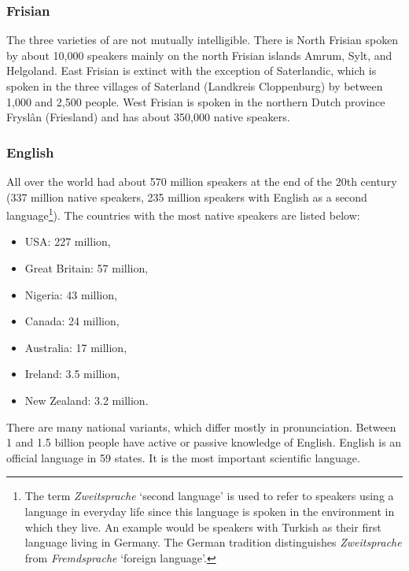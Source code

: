 \subsubsection{Frisian}

The three varieties of  are not mutually intelligible. There is North Frisian spoken by
about 10,000 speakers mainly on the north Frisian islands Amrum, Sylt, and Helgoland. East Frisian
is extinct with the exception of Saterlandic, which is spoken in the three villages of Saterland
(Landkreis Cloppenburg) by between 1,000 and 2,500 people.
West Frisian is spoken in the northern Dutch province Fryslân (Friesland) and has about 350,000
native speakers.



\subsubsection{English}

All over the world  had about 570 million speakers at the end of the 20th century 
(337 million native speakers, 235 million speakers with English as a second language\footnote{%
  The term \emph{Zweitsprache} `second language' is used to refer to speakers using a language in
  everyday life since this language is spoken in the environment in which they live. An example would be speakers with
  Turkish as their first language living in Germany. The German tradition distinguishes
  \emph{Zweitsprache} from \emph{Fremdsprache} `foreign language'.%
}). The countries with the most native speakers are listed below: 
\begin{itemize}
\item USA: 227 million,
\item Great Britain: 57 million,
\item Nigeria: 43 million, 
\item Canada: 24 million,
\item Australia: 17 million,
\item Ireland: 3.5 million,
\item New Zealand: 3.2 million.
\end{itemize}
There are many national variants, which differ mostly in pronunciation.
Between 1 and 1.5 billion people have active or passive knowledge of English.
English is an official language in 59 states. It is the most important scientific language.




